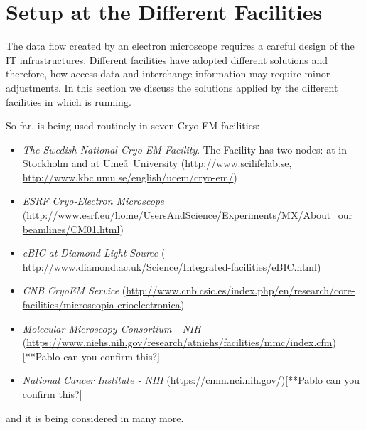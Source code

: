 \section{\scipion Setup at the Different Facilities}

The data flow created by an electron microscope requires a careful design of the IT infrastructures.  Different facilities have adopted different solutions and therefore, how \scipion  access data and interchange information may require minor adjustments. In this section we discuss  the  solutions applied by the different facilities in which \scipion is running.

So far, \scipion is being used routinely in seven Cryo-EM facilities:
\begin{itemize}
 \itemsep0em 

 \item \emph{The Swedish National Cryo-EM Facility}. The Facility has two nodes: at \scilifelab in Stockholm and at Ume\aa\ University (\url{http://www.scilifelab.se}, \url{http://www.kbc.umu.se/english/ucem/cryo-em/})
 \item \emph{ESRF Cryo-Electron Microscope} (\url{http://www.esrf.eu/home/UsersAndScience/Experiments/MX/About_our_beamlines/CM01.html})
 \item \emph{eBIC at Diamond Light Source} ( \url{http://www.diamond.ac.uk/Science/Integrated-facilities/eBIC.html})
 \item \emph{CNB CryoEM Service} (\url{http://www.cnb.csic.es/index.php/en/research/core-facilities/microscopia-crioelectronica})
 \item \emph{Molecular Microscopy Consortium - NIH} (\url{https://www.niehs.nih.gov/research/atniehs/facilities/mmc/index.cfm})[**Pablo can you confirm this?]
 \item \emph{National Cancer Institute - NIH} (\url{https://cmm.nci.nih.gov/})[**Pablo can you confirm this?]
 
\end{itemize}
and it is being considered in many more.

